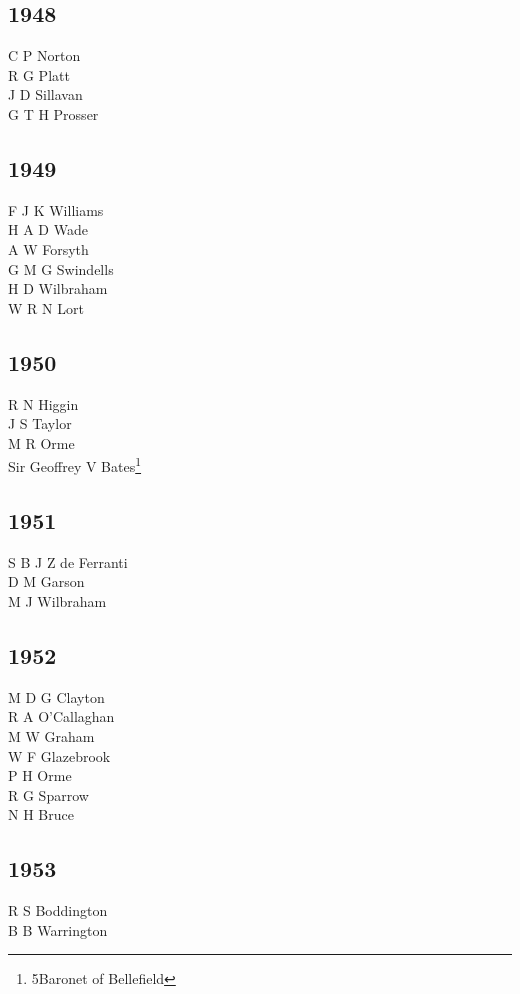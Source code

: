 \begin{multicols}{3}
  \subsection*{1948}
  C P Norton \\
  R G Platt \\
  J D Sillavan \\
  G T H Prosser \\
  \subsection*{1949}
  F J K Williams \\
  H A D Wade \\
  A W Forsyth \\
  G M G Swindells \\
  H D Wilbraham \\
  W R N Lort \\
  \subsection*{1950}
  R N Higgin \\
  J S Taylor \\
  M R Orme \\
  Sir Geoffrey V Bates\footnote{5\nth Baronet of Bellefield} \\
  \subsection*{1951}
  S B J Z de Ferranti \\
  D M Garson \\
  M J Wilbraham \\
  \subsection*{1952}
  M D G Clayton \\
  R A O'Callaghan \\
  M W Graham \\
  W F Glazebrook \\
  P H Orme \\
  R G Sparrow \\
  N H Bruce \\
  \subsection*{1953}
  R S Boddington \\
  B B Warrington \\

\end{multicols}
